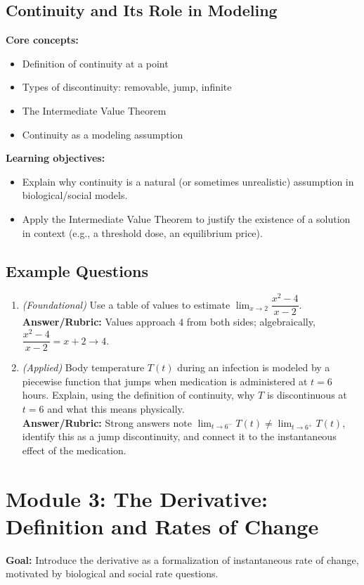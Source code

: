 \documentclass{article}
\begin{document}
\subsection{Continuity and Its Role in Modeling}
\textbf{Core concepts:}
\begin{itemize}[leftmargin=*]
  \item Definition of continuity at a point
  \item Types of discontinuity: removable, jump, infinite
  \item The Intermediate Value Theorem
  \item Continuity as a modeling assumption
\end{itemize}
\textbf{Learning objectives:}
\begin{itemize}[leftmargin=*]
  \item Explain why continuity is a natural (or sometimes unrealistic) assumption in biological/social models.
  \item Apply the Intermediate Value Theorem to justify the existence of a solution in context (e.g., a threshold dose, an equilibrium price).
\end{itemize}

\subsection*{Example Questions}
\begin{enumerate}[leftmargin=*]
  \item \textit{(Foundational)} Use a table of values to estimate $\lim_{x \to 2} \dfrac{x^2-4}{x-2}$. \\
  \textbf{Answer/Rubric:} Values approach $4$ from both sides; algebraically, $\dfrac{x^2-4}{x-2}=x+2 \to 4$.
  \item \textit{(Applied)} Body temperature $T(t)$ during an infection is modeled by a piecewise function that jumps when medication is administered at $t=6$ hours. Explain, using the definition of continuity, why $T$ is discontinuous at $t=6$ and what this means physically. \\
  \textbf{Answer/Rubric:} Strong answers note $\lim_{t \to 6^-} T(t) \ne \lim_{t \to 6^+} T(t)$, identify this as a jump discontinuity, and connect it to the instantaneous effect of the medication.
\end{enumerate}


\section{Module 3: The Derivative: Definition and Rates of Change}
\textbf{Goal:} Introduce the derivative as a formalization of instantaneous rate of change, motivated by biological and social rate questions.
\end{document}
